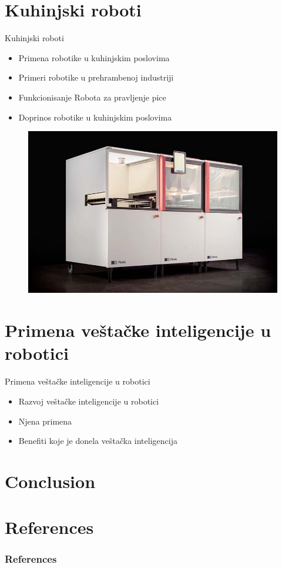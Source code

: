 \documentclass{beamer}
\begin{document}
\section{Kuhinjski roboti}
\begin{frame}{Kuhinjski roboti}
   \begin{itemize}
      \item Primena robotike u kuhinjskim poslovima
      \item Primeri robotike u prehrambenoj industriji
      \item Funkcionisanje Robota za pravljenje pice
      \item Doprinos robotike u kuhinjskim poslovima
       \end{itemize}

   
   \begin{figure}
       \centering
       \includegraphics[scale=0.20]{picnic-featured-image-web.jpg}
   \end{figure}
\end{frame}  
\section{Primena veštačke inteligencije u robotici}
\begin{frame}{Primena veštačke inteligencije u robotici}
   \begin{itemize}
       \item Razvoj veštačke inteligencije u robotici
       \item Njena primena
       \item Benefiti koje je donela veštačka inteligencija
   \end{itemize}
    
\end{frame}
    


\section{Conclusion}
%


\section*{References}
\begin{frame}
    \frametitle{References}
    
    
\end{frame}
\end{document}

